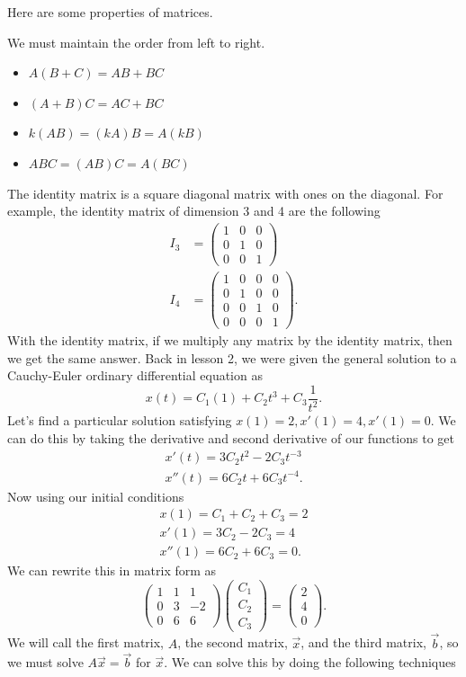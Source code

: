 Here are some properties of matrices. 
\begin{note}
  We must maintain the order from left to right.
\end{note}
\begin{itemize}
  \item $A(B+C)=AB+BC$
  \item $(A+B)C=AC+BC$
  \item $k(AB)=(kA)B=A(kB)$
  \item $ABC=(AB)C=A(BC)$
\end{itemize}
The identity matrix is a square diagonal matrix with ones on the diagonal. For example, the identity matrix of dimension 3 and 4 are the following 
\begin{align*}
  I_3&=\begin{pmatrix} 1&0&0\\0&1&0\\0&0&1 \end{pmatrix} \\
  I_4&=\begin{pmatrix} 1&0&0&0\\0&1&0&0\\0&0&1&0\\0&0&0&1 \end{pmatrix} 
.\end{align*}
With the identity matrix, if we multiply any matrix by the identity matrix, then we get the same answer. Back in lesson 2, we were given the general solution to a Cauchy-Euler ordinary differential equation as \[
  x(t)=C_1(1)+C_2t^3+C_3 \frac{1}{t^2}
.\] Let's find a particular solution satisfying $x(1)=2,x'(1)=4,x'(1)=0$. We can do this by taking the derivative and second derivative of our functions to get 
\begin{align*}
  x'(t)=3C_2t^2-2C_3t ^{-3}\\
  x''(t)=6C_2t+6C_3t ^{-4}
.\end{align*}
Now using our initial conditions
\begin{align*}
  x(1)=C_1+C_2+C_3=2\\
  x'(1)=3C_2-2C_3=4\\
  x''(1)=6C_2+6C_3=0
.\end{align*}
We can rewrite this in matrix form as \[
  \begin{pmatrix} 1&1&1\\0&3&-2\\0&6&6 \end{pmatrix} \begin{pmatrix} C_1\\C_2\\C_3 \end{pmatrix} =\begin{pmatrix} 2\\4\\0 \end{pmatrix} 
.\] We will call the first matrix, $A$, the second matrix, $\vec{x}$, and the third matrix, $\vec{b}$, so we must solve $A\vec{x}=\vec{b}$ for $\vec{x}$. We can solve this by doing the following techniques
